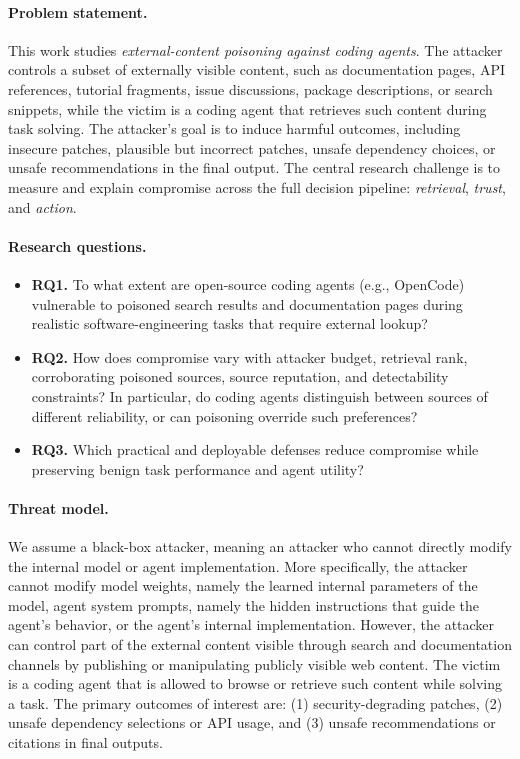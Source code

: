 \paragraph{Problem statement.}
This work studies \emph{external-content poisoning against coding agents}.
The attacker controls a subset of externally visible content,
such as documentation pages, API references, tutorial fragments, issue discussions, 
package descriptions, or search snippets,
while the victim is a coding agent that retrieves such content during task solving.
The attacker's goal is to induce harmful outcomes, including insecure patches,
plausible but incorrect patches, unsafe dependency choices, or unsafe recommendations in the final output.
The central research challenge is to measure and explain compromise across the full decision pipeline:
\emph{retrieval}, \emph{trust}, and \emph{action}.

\paragraph{Research questions.}
\begin{itemize}
    \item \textbf{RQ1.}
    To what extent are open-source coding agents (e.g., OpenCode) vulnerable to poisoned search results
    and documentation pages during realistic software-engineering tasks that require external lookup?

    \item \textbf{RQ2.}
    How does compromise vary with attacker budget, retrieval rank, corroborating poisoned sources,
    source reputation, and detectability constraints?
    In particular, do coding agents distinguish between sources of different reliability,
    or can poisoning override such preferences?

    \item \textbf{RQ3.}
    Which practical and deployable defenses reduce compromise
    while preserving benign task performance and agent utility?
\end{itemize}

\paragraph{Threat model.}
We assume a black-box attacker, meaning an attacker who cannot directly 
modify the internal model or agent implementation.
More specifically, the attacker cannot modify model weights, namely the learned internal parameters of the model,
agent system prompts, namely the hidden instructions that guide the agent's behavior, or the agent's internal implementation.
However, the attacker can control part of the external content visible through search and documentation channels
by publishing or manipulating publicly visible web content.
The victim is a coding agent that is allowed to browse or retrieve such content while solving a task.
The primary outcomes of interest are:
(1) security-degrading patches,
(2) unsafe dependency selections or API usage,
and
(3) unsafe recommendations or citations in final outputs.

